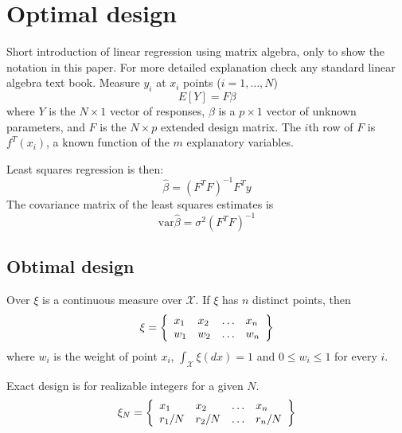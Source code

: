 \documentclass[12pt]{iopart}
\begin{document}
\section{Optimal design}
Short introduction of linear regression using matrix algebra, only to show the notation in this paper. For more detailed explanation check any standard linear algebra text book. Measure $y_i$ at $x_i$ points ($i=1, \ldots, N$)
\begin{equation}
E[Y] = F \beta 
\end{equation}
where $Y$ is the $N \times 1$ vector of responses, $\beta$ is a $p \times 1$ vector of unknown parameters, and $F$ is the $N \times p$ extended design matrix. The $i$th row of $F$ is $f^T(x_i)$, a known function of the $m$ explanatory variables.

Least squares regression is then:
\begin{equation}
\hat \beta = (F^T F)^{-1} F^T y
\end{equation}
The covariance matrix of the least squares estimates is
\begin{equation}
\mathrm{var} \hat \beta = \sigma^2 (F^T F)^{-1}
\end{equation}


\subsection{Obtimal design}
Over $\xi$ is a continuous measure over $\mathcal{X}$. If $\xi$ has $n$ distinct points, then
\begin{equation}
\xi = \left\{ 
  \begin{array}{l l l l}
    x_1 & x_2 & \ldots & x_n\\
    w_1 & w_2 & \ldots & w_n\\
  \end{array} \right \}
\end{equation}
where $w_i$ is the weight of point $x_i$, $\int_{\mathcal{X}}\xi(dx) = 1$ and $0 \leq w_i \leq 1$ for every $i$.

Exact design is for realizable integers for a given $N$.
\begin{equation}
\xi_N = \left\{ 
  \begin{array}{l l l l}
    x_1 & x_2 & \ldots & x_n\\
    r_1/N & r_2/N & \ldots & r_n/N\\
  \end{array} \right \}
\end{equation}
\end{document}
